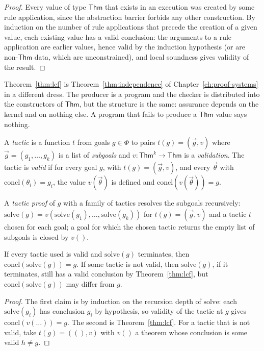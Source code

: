 \begin{proof}
Every value of type $\mathsf{Thm}$ that exists in an execution was created by some rule application, since the abstraction barrier forbids any other construction. By induction on the number of rule applications that precede the creation of a given value, each existing value has a valid conclusion: the arguments to a rule application are earlier values, hence valid by the induction hypothesis (or are non-$\mathsf{Thm}$ data, which are unconstrained), and local soundness gives validity of the result.
\end{proof}

Theorem~\ref{thm:lcf} is Theorem~\ref{thm:independence} of Chapter~\ref{ch:proof-systems} in a different dress. The producer is a program and the checker is distributed into the constructors of $\mathsf{Thm}$, but the structure is the same: assurance depends on the kernel and on nothing else. A program that fails to produce a $\mathsf{Thm}$ value says nothing.

\begin{definition}[Tactic]
\label{def:tactic}
A \emph{tactic} is a function $t$ from goals $g\in\Phi$ to pairs $t(g)=(\vec g,v)$ where $\vec g=(g_1,\dots,g_k)$ is a list of \emph{subgoals} and $v:\mathsf{Thm}^k\to\mathsf{Thm}$ is a \emph{validation}. The tactic is \emph{valid} if for every goal $g$, with $t(g)=(\vec g,v)$, and every $\vec\theta$ with $\mathrm{concl}(\theta_i)=g_i$, the value $v(\vec\theta)$ is defined and $\mathrm{concl}(v(\vec\theta))=g$.
\end{definition}

A \emph{tactic proof} of $g$ with a family of tactics resolves the subgoals recursively: $\mathrm{solve}(g)=v(\mathrm{solve}(g_1),\dots,\mathrm{solve}(g_k))$ for $t(g)=(\vec g,v)$ and a tactic $t$ chosen for each goal; a goal for which the chosen tactic returns the empty list of subgoals is closed by $v()$.

\begin{proposition}
\label{prop:tactic}
If every tactic used is valid and $\mathrm{solve}(g)$ terminates, then $\mathrm{concl}(\mathrm{solve}(g))=g$. If some tactic is not valid, then $\mathrm{solve}(g)$, if it terminates, still has a valid conclusion by Theorem~\ref{thm:lcf}, but $\mathrm{concl}(\mathrm{solve}(g))$ may differ from $g$.
\end{proposition}

\begin{proof}
The first claim is by induction on the recursion depth of $\mathrm{solve}$: each $\mathrm{solve}(g_i)$ has conclusion $g_i$ by hypothesis, so validity of the tactic at $g$ gives $\mathrm{concl}(v(\ldots))=g$. The second is Theorem~\ref{thm:lcf}. For a tactic that is not valid, take $t(g)=((),v)$ with $v()$ a theorem whose conclusion is some valid $h\ne g$.
\end{proof}


